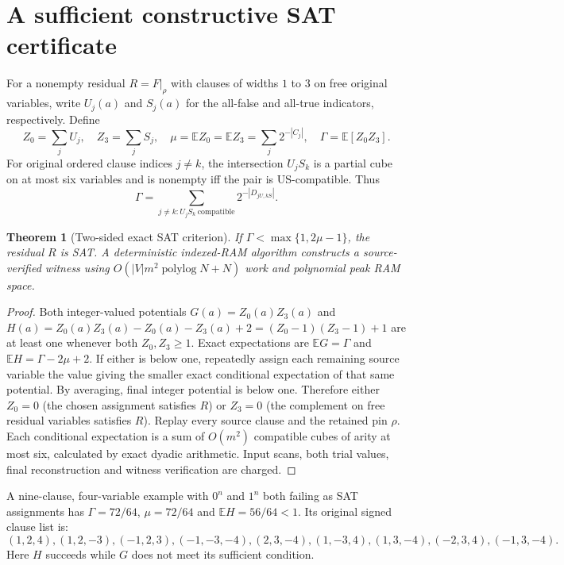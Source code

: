 \documentclass[10pt]{article}
\newtheorem{theorem}{Theorem}
\begin{document}
\section{A sufficient constructive SAT certificate}
For a nonempty residual $R=F|_\rho$ with clauses of widths $1$ to $3$ on free original variables, write $U_j(a)$ and $S_j(a)$ for the all-false and all-true indicators, respectively. Define
\[
Z_0=\sum_j U_j,\quad Z_3=\sum_j S_j,\quad
\mu=\mathbb EZ_0=\mathbb EZ_3=\sum_j2^{-|C_j|},\quad
\Gamma=\mathbb E[Z_0Z_3].
\]
For original ordered clause indices $j\ne k$, the intersection $U_jS_k$ is a partial cube on at most six variables and is nonempty iff the pair is US-compatible. Thus
\[
\Gamma=\sum_{j\ne k:U_jS_k\ \mathrm{compatible}}2^{-|D_{jU,kS}|}.
\]
\begin{theorem}[Two-sided exact SAT criterion]
If $\Gamma<\max\{1,2\mu-1\}$, the residual $R$ is SAT. A deterministic indexed-RAM algorithm constructs a source-verified witness using $O(|V|m^2\operatorname{polylog}N+N)$ work and polynomial peak RAM space.
\end{theorem}
\begin{proof}
Both integer-valued potentials
$G(a)=Z_0(a)Z_3(a)$ and
$H(a)=Z_0(a)Z_3(a)-Z_0(a)-Z_3(a)+2=(Z_0-1)(Z_3-1)+1$
are at least one whenever both $Z_0,Z_3\ge1$. Exact expectations are $\mathbb EG=\Gamma$ and $\mathbb EH=\Gamma-2\mu+2$. If either is below one, repeatedly assign each remaining source variable the value giving the smaller exact conditional expectation of that same potential. By averaging, final integer potential is below one. Therefore either $Z_0=0$ (the chosen assignment satisfies $R$) or $Z_3=0$ (the complement on free residual variables satisfies $R$). Replay every source clause and the retained pin $\rho$. Each conditional expectation is a sum of $O(m^2)$ compatible cubes of arity at most six, calculated by exact dyadic arithmetic. Input scans, both trial values, final reconstruction and witness verification are charged.
\end{proof}
A nine-clause, four-variable example with $0^n$ and $1^n$ both failing as SAT assignments has $\Gamma=72/64$, $\mu=72/64$ and $\mathbb EH=56/64<1$. Its original signed clause list is:
\[
(1,2,4),(1,2,-3),(-1,2,3),(-1,-3,-4),(2,3,-4),
(1,-3,4),(1,3,-4),(-2,3,4),(-1,3,-4).
\]
Here $H$ succeeds while $G$ does not meet its sufficient condition.
\end{document}
